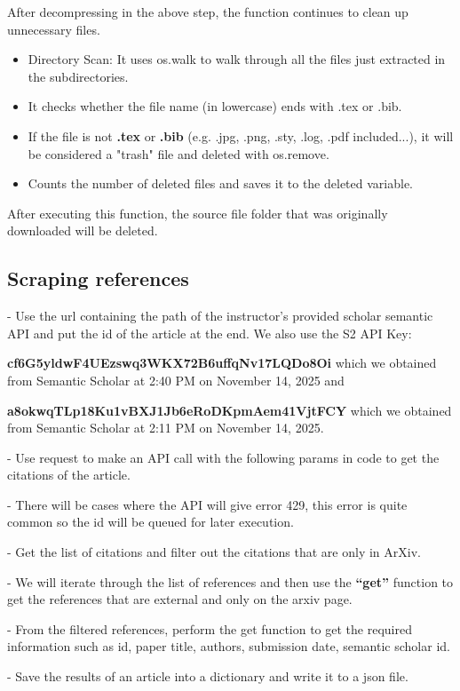 \documentclass[12pt]{article}
\begin{document}
After decompressing in the above step, the function continues to clean up unnecessary files.
\begin{itemize}
    \item Directory Scan: It uses os.walk to walk through all the files just extracted in the subdirectories.
    \item It checks whether the file name (in lowercase) ends with .tex or .bib.
    \item If the file is not \textbf{.tex} or \textbf{.bib} (e.g. .jpg, .png, .sty, .log, .pdf included...), it will be considered a "trash" file and deleted with os.remove.
    \item Counts the number of deleted files and saves it to the deleted variable.
\end{itemize}

After executing this function, the source file folder that was originally downloaded will be deleted.
\subsection{Scraping references}
- Use the url containing the path of the instructor's provided scholar semantic API and put the id of the article at the end. We also use the S2 API Key:

\textbf{cf6G5yldwF4UEzswq3WKX72B6uffqNv17LQDo8Oi} which we obtained from Semantic Scholar at 2:40 PM on November 14, 2025 and 

\textbf{a8okwqTLp18Ku1vBXJ1Jb6eRoDKpmAem41VjtFCY} which we obtained from Semantic Scholar at 2:11 PM on November 14, 2025.

- Use request to make an API call with the following params in code to get the citations of the article.

- There will be cases where the API will give error 429, this error is quite common so the id will be queued for later execution.

- Get the list of citations and filter out the citations that are only in ArXiv.

- We will iterate through the list of references and then use the \textbf{\enquote{get}} function to get the references that are external and only on the arxiv page.

- From the filtered references, perform the get function to get the required information such as id, paper title, authors, submission date, semantic scholar id.

- Save the results of an article into a dictionary and write it to a json file.
\end{document}
